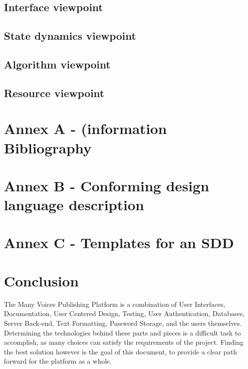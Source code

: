\documentclass[letterpaper, 10pt, draftclsnofoot, compsoc, onecolumn]{IEEEtran}
\begin{document}
\subsection{Interface viewpoint}
{\noindent \par}

\subsection{State dynamics viewpoint}
{\noindent \par}

\subsection{Algorithm viewpoint}
{\noindent \par}

\subsection{Resource viewpoint}
{\noindent \par}



\section{Annex A - (information Bibliography}


%


\section{Annex B - Conforming design language description}
{\noindent \par}

\section{Annex C - Templates for an SDD}
{\noindent \par}


\newpage
\section{Conclusion}
{\noindent  The Many Voices Publishing Platform is a combination of User Interfaces, Documentation, User Centered Design, Testing, User Authentication, Databases, Server Back-end, Text Formatting, Password Storage, and the users themselves. Determining the technologies behind these parts and pieces is a difficult task to accomplish, as many choices can satisfy the requirements of the project. Finding the best solution however is the goal of this document, to provide a clear path forward for the platform as a whole. \par}

%
%
\end{document}
